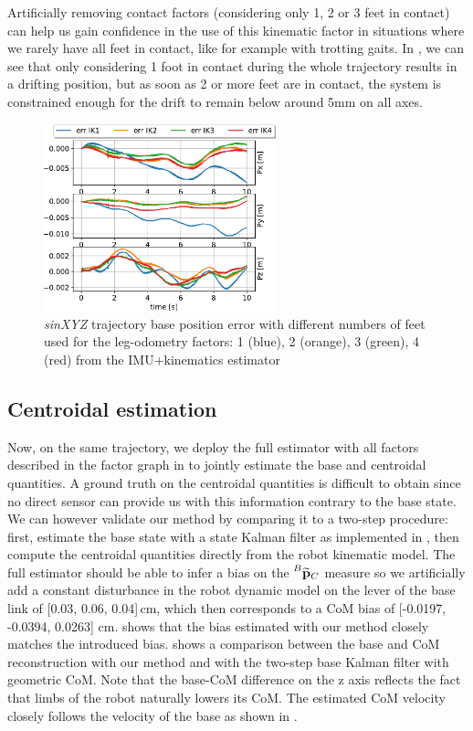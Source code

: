 Artificially removing contact factors (considering only 1, 2 or 3 feet in contact) can help us gain confidence in the use of this kinematic factor 
in situations where we rarely have all feet in contact, like for example with trotting gaits. In , we can see that only considering 
1 foot in contact during the whole trajectory results in a drifting position, but as soon as 2 or more feet are in contact, the system is constrained enough 
for the drift to remain below around 5mm on all axes. 
%
\begin{figure}[h]
    \centering
    \includegraphics[width=0.6\textwidth]{figures/centroidal/base_position_err_IKn.pdf}
    \caption{\textit{sinXYZ} trajectory base position error with different numbers of feet used for the leg-odometry factors: 
    1 (blue), 2 (orange), 3 (green), 4 (red) from the IMU+kinematics estimator}
    \label{fig:ErrIKn}
\end{figure}
%

\subsection{Centroidal estimation}

Now, on the same trajectory, we deploy the full estimator with all factors described in the factor graph in  to jointly 
estimate the base and centroidal quantities. A ground truth on the centroidal quantities is difficult to obtain since no direct 
sensor can provide us with this information contrary to the base state. 
We can however validate our method by comparing it to a two-step procedure: first, estimate the base state with a state Kalman filter as 
implemented in \cite{bledt2018cheetah}, then compute the centroidal quantities directly from the robot kinematic model. 
The full estimator should be able to infer a bias on the $\prescript{B}{}{\widetilde{{\bf p}}}_{C}$ measure so we artificially add a constant disturbance 
in the robot dynamic model on the lever of the base link of [0.03, 0.06, 0.04]\,cm, which then corresponds to a CoM bias of 
[-0.0197, -0.0394,  0.0263] cm.  shows that the bias estimated with our method closely matches the introduced bias. 
 shows a comparison between the base and CoM reconstruction with our method and with the two-step base Kalman filter 
with geometric CoM. Note that the base-CoM difference on the z axis reflects the fact that limbs of the robot naturally lowers  its CoM. 
The estimated CoM velocity closely follows the velocity of the base as shown in .


